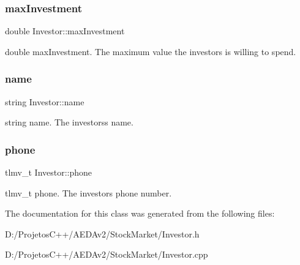\subsubsection{\texorpdfstring{max\+Investment}{maxInvestment}}
{\footnotesize\ttfamily double Investor\+::max\+Investment\hspace{0.3cm}{\ttfamily [private]}}

double max\+Investment. The maximum value the investors is willing to spend. \mbox{\label{class_investor_a82fefdc76097ed0bd17f5131ccaee434}} 
\subsubsection{\texorpdfstring{name}{name}}
{\footnotesize\ttfamily string Investor\+::name\hspace{0.3cm}{\ttfamily [private]}}

string name. The investors\textquotesingle{}s name. \mbox{\label{class_investor_a76caf9af875e152486a1b5cd80264119}} 
\subsubsection{\texorpdfstring{phone}{phone}}
{\footnotesize\ttfamily tlmv\+\_\+t Investor\+::phone\hspace{0.3cm}{\ttfamily [private]}}

tlmv\+\_\+t phone. The investor\textquotesingle{}s phone number. 

The documentation for this class was generated from the following files\+:\begin{DoxyCompactItemize}
\item 
D\+:/\+Projetos\+C++/\+A\+E\+D\+Av2/\+Stock\+Market/Investor.\+h\item 
D\+:/\+Projetos\+C++/\+A\+E\+D\+Av2/\+Stock\+Market/Investor.\+cpp\end{DoxyCompactItemize}
